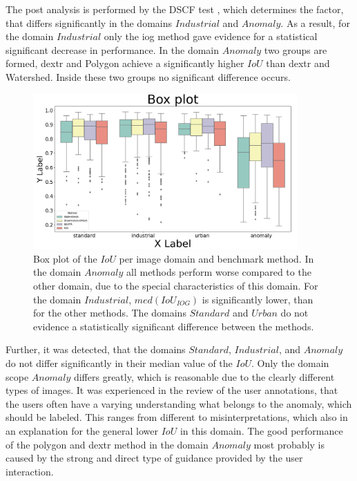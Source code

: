The post analysis is performed by the DSCF test \cite{CF91-dscf}, which determines the factor, that differs significantly in the domains $ Industrial $ and $ Anomaly $.
As a result, for the domain $ Industrial $ only the \gls{iog} method gave evidence for a statistical significant decrease in performance.
In the domain $ Anomaly $ two groups are formed, \gls{dextr} and Polygon achieve a significantly higher $ IoU $ than \gls{dextr} and Watershed.
Inside these two groups no significant difference occurs.
\begin{figure}
	\centering
	\includegraphics[width=0.9\textwidth]{figures/chap52_boxplot.png}
	\caption[Box plot IoU per domain and method]{
		Box plot of the $ IoU $ per image domain and benchmark method.
		In the domain $ Anomaly $ all methods perform worse compared to the other domain, due to the special characteristics of this domain.
		For the domain $ Industrial $, $med \left( IoU_{IOG} \right) $ is significantly lower, than for the other methods.
		The domains $ Standard $ and $ Urban $ do not evidence a statistically significant difference between the methods.
	} \label{fig:ch5:sec2:domains_box_plot}
\end{figure}

Further, it was detected, that the domains $ Standard $, $ Industrial $, and $ Anomaly $ do not differ significantly in their median value of the $ IoU $.
Only the domain scope $ Anomaly $ differs greatly, which is reasonable due to the clearly different types of images.
It was experienced in the review of the user annotations, that the users often have a varying understanding what belongs to the anomaly, which should be labeled.
This ranges from different to misinterpretations, which also in an explanation for the general lower $ IoU $ in this domain.
The good performance of the polygon and \gls{dextr} method in the domain $ Anomaly $ most probably is caused by the strong and direct type of guidance provided by the user interaction.

